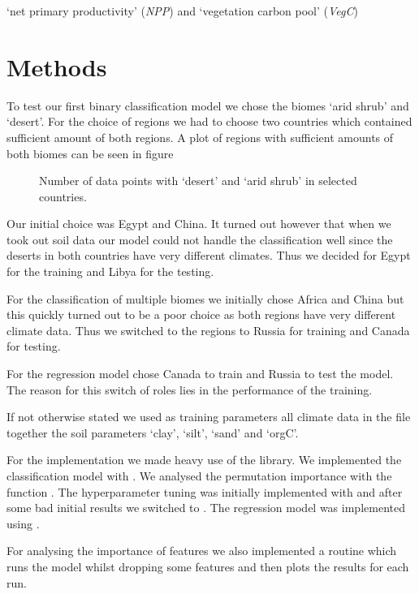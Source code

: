 `net primary productivity' (\emph{NPP}) and `vegetation carbon pool' (\emph{VegC})

\section{Methods}

To test our first binary classification model we chose the biomes `arid shrub' and `desert'. For the choice of regions
we had to choose two countries which contained sufficient amount of both regions. A plot of regions with sufficient amounts
of both biomes can be seen in figure 
\begin{figure}
  \centering
  \begin{minipage}{0.45\textwidth}
    \centering
    \missingfigure[figwidth=\textwidth]{}
    \caption{Number of data points with `desert' and `arid shrub' in selected countries.}
    \label{pl:}
  \end{minipage}
\end{figure}
Our initial choice was Egypt and China.
It turned out however that when we took out soil data our model could not handle the classification well since 
the deserts in both countries have very different climates. Thus we decided for Egypt for the training and Libya for the testing.

For the classification of multiple biomes we initially chose Africa and China but this quickly turned out to be a poor choice as
both regions have very different climate data. Thus we switched to the regions to Russia for training and Canada for testing.

For the regression model chose Canada to train and Russia to test the model. The reason for this switch of roles lies in the performance
of the training.

If not otherwise stated we used as training parameters all climate data in the file  together the soil parameters `clay', `silt', `sand' and `orgC'.

For the implementation we made heavy use of the  library. We implemented the classification model with .
We analysed the permutation importance with the function .
The hyperparameter tuning was initially implemented with  and after some bad initial results we switched to .
The regression model was implemented using .

For analysing the importance of features we also implemented a routine which runs the model whilst dropping some features
and then plots the results for each run.


